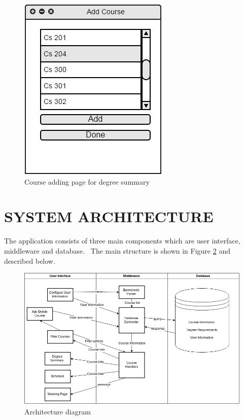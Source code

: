 \documentclass[twoside,letterpaper]{article}
\begin{document}
\begin{figure}[h!]
\centering
\includegraphics[keepaspectratio, scale=0.6]{Mockups/addCourseDegree.png}
\caption{Course adding page for degree summary}
\label{fig:mockupAddDegree}
\end{figure}

\clearpage\section[SYSTEM ARCHITECTURE]{\rmfamily\bfseries\color{black}
SYSTEM ARCHITECTURE}

{\color{black}
The application consists of three main components which are user interface, middleware and database. \ The main structure is shown in Figure \ref{fig:architecture_diagram} and described below.}

\begin{figure}[h]
\centering
\includegraphics[width=\linewidth]{architecturediagram.png}
\caption{Architecture diagram}
\label{fig:architecture_diagram}
\end{figure}
\end{document}

